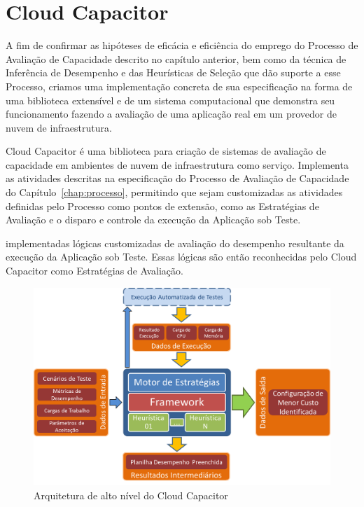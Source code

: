 \chapter[Cloud Capacitor]{Cloud Capacitor}
\label{chap:capacitor}
A fim de confirmar as hipóteses de eficácia e eficiência do emprego do Processo
de Avaliação de Capacidade descrito no capítulo anterior, bem como da técnica de
Inferência de Desempenho e das Heurísticas de Seleção que dão suporte a esse Processo, 
criamos uma implementação concreta de sua especificação na forma de uma biblioteca
extensível e de um sistema computacional que demonstra seu funcionamento fazendo
a avaliação de uma aplicação real em um provedor de nuvem de infraestrutura.

Cloud Capacitor é uma biblioteca para criação de sistemas de avaliação de 
capacidade em ambientes de nuvem de infraestrutura como serviço. Implementa as
atividades descritas na especificação do Processo de Avaliação de Capacidade do 
Capítulo~\ref{chap:processo}, permitindo que sejam customizadas as atividades
definidas pelo Processo como pontos de extensão, como as Estratégias de Avaliação
e o disparo e controle da execução da Aplicação sob Teste.

implementadas lógicas customizadas de avaliação do desempenho resultante
da execução da Aplicação sob Teste. Essas lógicas são então reconhecidas pelo Cloud 
Capacitor como Estratégias de Avaliação.

\begin{figure}[htb]
  \caption{\label{fig_arq_alto_nivel}Arquitetura de alto nível do Cloud Capacitor}
  \begin{center}
    \includegraphics[scale=0.5]{img/arquiteturaAltoNivel}
  \end{center}
\end{figure}

